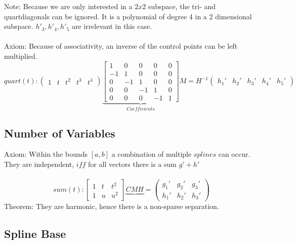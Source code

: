 \documentclass[a4paper,landscape]{report}
\begin{document}
Note: Because we are only interested in a $2x2$ subspace, the tri- and quartdiagonals can be ignored. It is a polynomial of degree 4 in a 2 dimensional subspace. $h'_{3},h'_{4},h'_{5}$ are irrelevant in this case.\\\\
Axiom: Because of associativity, an inverse of the control points can be left multiplied.
\begin{equation}
quart(t):
\begin{pmatrix}
1 & t & t^2 & t^3 & t^4
\end{pmatrix}
\underbrace{\begin{bmatrix}
1 & 0 & 0 & 0 & 0\\
-1 & 1 & 0 & 0 & 0\\
0 & -1 &1 & 0 & 0\\
0 & 0 & -1 & 1 & 0\\
0 & 0 & 0 & -1 & 1
\end{bmatrix}}_{Coefficients}
M
=
H^{-1}
\begin{pmatrix}
h_{1}' & h_{2}' & h_{3}' & h_{4}' & h_{5}'
\end{pmatrix}
\end{equation}

\subsection{Number of Variables}
Axiom: Within the bounds $[a,b]$ a combination of multiple $splines$ can occur. They are independent, $iff$ for all vectors there is a sum $g' +h'$\\\\
\begin{equation}
sum(t):
\begin{bmatrix}
1 & t & t^2\\
1 & u & u^2
\end{bmatrix}
\underbrace{CMH}_{}
=
\begin{pmatrix}
g_{1}' & g_{2}' & g_{3}'\\
h_{1}' & h_{2}' & h_{3}'
\end{pmatrix}
\end{equation}
Theorem: They are harmonic, hence there is a non-sparse separation.

\subsection{Spline Base}
\end{document}
